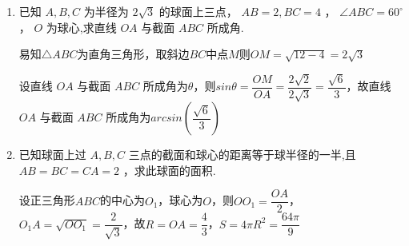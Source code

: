\begin{enumerate}
    \item 已知 $A,B,C$ 为半径为 $2\sqrt{3}$ 的球面上三点， ${AB} = 2,{BC} = 4$ ， $\angle {ABC} = {60}^{ \circ  }$ ， $O$ 为球心,求直线 ${OA}$ 与截面 ${ABC}$ 所成角.
    \begin{jieda}
        易知$\triangle ABC$为直角三角形，取斜边$BC$中点$M$则$OM = \sqrt{12-4} = 2\sqrt{3}$

        设直线 ${OA}$ 与截面 ${ABC}$ 所成角为$\theta$，则$sin\theta = \dfrac{OM}{OA} = \dfrac{2\sqrt{2}}{2\sqrt{3}} = \dfrac{\sqrt{6}}{3}$，故直线 ${OA}$ 与截面 ${ABC}$ 所成角为$arcsin\left(\dfrac{\sqrt{6}}{3}\right)$
    \end{jieda}
    
    \item 已知球面上过 $A,B,C$ 三点的截面和球心的距离等于球半径的一半,且 ${AB} = {BC} = {CA} = 2$ ，求此球面的面积.
    \begin{jieda}
        设正三角形$ABC$的中心为$O_1$，球心为$O$，则$OO_1 = \dfrac{OA}{2}$，$O_1A = \sqrt{OO_1} = \dfrac{2}{\sqrt{3}}$，故$R = OA = \dfrac{4}{3}$，$S = 4\pi R^2 = \dfrac{64\pi}{9}$
    \end{jieda}
\end{enumerate}

